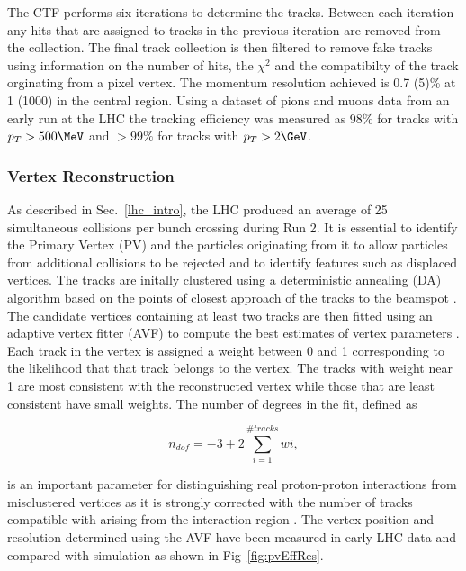 The CTF performs six iterations to determine the tracks. Between each iteration any hits that are assigned to tracks in the
previous iteration are removed from the collection. The final track collection is then filtered to remove fake tracks using 
information on the number of hits, the $\chi^2$ and the compatibilty of the track orginating from a pixel vertex. The momentum 
resolution achieved is 0.7 (5)\% at 1 (1000) \GeV in the central region\cite{tracker_early}. Using a dataset of pions and muons data from an early run 
at the LHC the tracking efficiency was measured as 98\% for tracks with $p_T > 500\MeV$ and $>99\%$ for tracks with $p_T > 2\GeV$\cite{tracker_eff}.

\subsubsection{Vertex Reconstruction}

As described in Sec.~\ref{lhc_intro}, the LHC produced an average of 25 simultaneous collisions per bunch crossing
during Run 2. It is essential to identify the Primary Vertex (PV) and the particles originating from it to allow 
particles from additional collisions to be rejected and to identify features such as displaced vertices. The tracks
are initally clustered using a deterministic annealing (DA) algorithm based on the points of closest approach of the 
tracks to the beamspot \cite{tracker_vertex}. The candidate vertices containing at least two tracks are then
fitted using an adaptive vertex fitter (AVF) to compute the best estimates of vertex parameters \cite{tracker_avf}. 
Each track in the vertex is assigned a weight between 0 and 1 corresponding to the likelihood that that track
belongs to the vertex. The tracks with weight near 1 are most consistent with the reconstructed vertex while
those that are least consistent have small weights. The number of degrees in the fit, defined as 

\begin{equation}
n_{dof} = -3 + 2 \sum_{i=1}^{\#tracks} wi,
\end{equation}

is an important parameter for distinguishing real proton-proton interactions from misclustered vertices as it is strongly corrected with
the number of tracks compatible with arising from the interaction region \cite{tracker_vertex}. The vertex
position and resolution determined using the AVF have been 
measured in early LHC data and compared with simulation as shown in Fig~\ref{fig:pvEffRes}.

